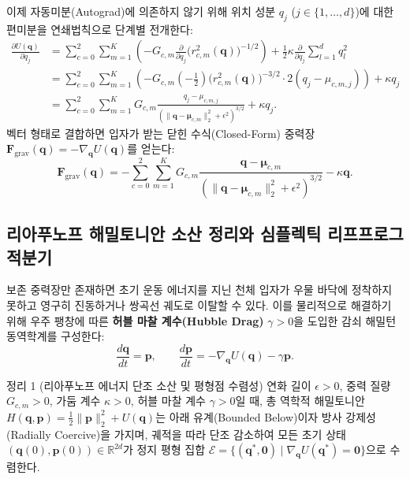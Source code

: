 \documentclass[11pt,a4paper]{article}
\begin{document}
이제 자동미분(Autograd)에 의존하지 않기 위해 위치 성분 $q_j$ ($j \in \{1,\dots,d\}$)에 대한 편미분을 연쇄법칙으로 단계별 전개한다:
\begin{align}
  \frac{\partial U(\mathbf{q})}{\partial q_j}
  &= \sum_{c=0}^{2}\sum_{m=1}^{K} \left( -G_{c,m} \frac{\partial}{\partial q_j} \Big( r_{c,m}^2(\mathbf{q}) \Big)^{-1/2} \right) + \frac{1}{2}\kappa \frac{\partial}{\partial q_j}\sum_{l=1}^{d} q_l^2 \nonumber \\
  &= \sum_{c=0}^{2}\sum_{m=1}^{K} \left( -G_{c,m} \left(-\frac{1}{2}\right) \Big( r_{c,m}^2(\mathbf{q}) \Big)^{-3/2} \cdot 2(q_j - \mu_{c,m,j}) \right) + \kappa q_j \nonumber \\
  &= \sum_{c=0}^{2}\sum_{m=1}^{K} G_{c,m} \frac{q_j - \mu_{c,m,j}}{\left(\|\mathbf{q} - \boldsymbol{\mu}_{c,m}\|_2^2 + \epsilon^2\right)^{3/2}} + \kappa q_j.
\end{align}
벡터 형태로 결합하면 입자가 받는 닫힌 수식(Closed-Form) 중력장 $\mathbf{F}_{\text{grav}}(\mathbf{q}) = -\nabla_{\mathbf{q}} U(\mathbf{q})$를 얻는다:
\begin{equation}
  \mathbf{F}_{\text{grav}}(\mathbf{q}) = -\sum_{c=0}^{2}\sum_{m=1}^{K} G_{c,m} \frac{\mathbf{q} - \boldsymbol{\mu}_{c,m}}{\left(\|\mathbf{q} - \boldsymbol{\mu}_{c,m}\|_2^2 + \epsilon^2\right)^{3/2}} - \kappa \mathbf{q}.
  \label{eq:grav_force}
\end{equation}

\subsection{리아푸노프 해밀토니안 소산 정리와 심플렉틱 리프프로그 적분기}

보존 중력장만 존재하면 초기 운동 에너지를 지닌 천체 입자가 우물 바닥에 정착하지 못하고 영구히 진동하거나 쌍곡선 궤도로 이탈할 수 있다. 이를 물리적으로 해결하기 위해 우주 팽창에 따른 \textbf{허블 마찰 계수(Hubble Drag)} $\gamma > 0$을 도입한 감쇠 해밀턴 동역학계를 구성한다:
\begin{equation}
  \frac{d\mathbf{q}}{dt} = \mathbf{p}, \qquad \frac{d\mathbf{p}}{dt} = -\nabla_{\mathbf{q}} U(\mathbf{q}) - \gamma \mathbf{p}.
  \label{eq:damped_hamiltonian_ode}
\end{equation}

\begin{theorembox}{정리 1 (리아푸노프 에너지 단조 소산 및 평형점 수렴성)}
연화 길이 $\epsilon > 0$, 중력 질량 $G_{c,m} > 0$, 가둠 계수 $\kappa > 0$, 허블 마찰 계수 $\gamma > 0$일 때, 총 역학적 해밀토니안 $H(\mathbf{q}, \mathbf{p}) = \frac{1}{2}\|\mathbf{p}\|_2^2 + U(\mathbf{q})$는 아래 유계(Bounded Below)이자 방사 강제성(Radially Coercive)을 가지며, 궤적을 따라 단조 감소하여 모든 초기 상태 $(\mathbf{q}(0), \mathbf{p}(0)) \in \mathbb{R}^{2d}$가 정지 평형 집합 $\mathcal{E} = \{(\mathbf{q}^*, \mathbf{0}) \mid \nabla_{\mathbf{q}} U(\mathbf{q}^*) = \mathbf{0}\}$으로 수렴한다.
\end{theorembox}
\end{document}
